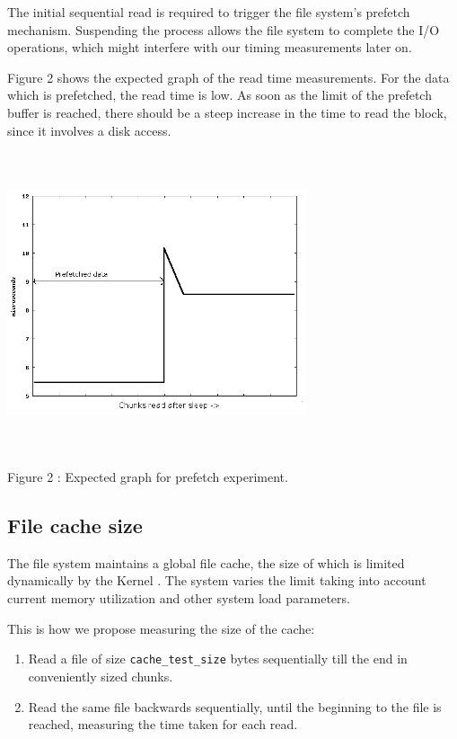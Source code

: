 \documentclass[twocolumn,11pt]{article}
\begin{document}
\begin{sloppypar}
The initial sequential read is required to trigger the file system's prefetch mechanism.
Suspending the process allows the file system to complete the I/O operations, which might
interfere with our timing measurements later on.

Figure 2 shows the expected graph of the read time measurements. For the data which is
prefetched, the read time is low. As soon as the limit of the prefetch buffer is reached,
there should be a steep increase in the time to read the block, since it involves a disk
access.

\includegraphics[width=250pt,height=250pt]{prefetch_ideal.png}
\begin{center}
Figure 2 : Expected graph for prefetch experiment.
\end{center}


\subsection{File cache size}

The file system maintains a global file cache, the size of which is limited
dynamically by the Kernel \cite{dynamic_fcache}. The system varies the limit taking into
account current memory utilization and other system load parameters.

This is how we propose measuring the size of the cache:
\begin{enumerate}
	\item Read a file of size {\tt cache\_test\_size} bytes sequentially till the
		 end in conveniently sized chunks.
	\item Read the same file backwards sequentially, until the beginning to the
		file is reached, measuring the time taken for each read.
\end{enumerate}


\end{sloppypar}
\end{document}
